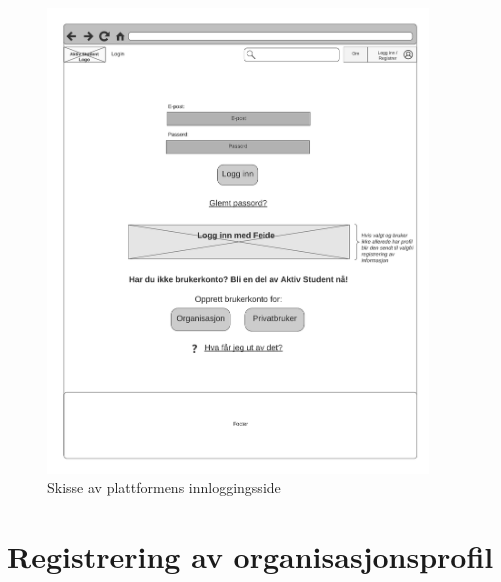 \begin{figure}[H]
\centering
\includegraphics[width=0.9\textwidth]{Illustrasjoner/Skisser/2.0/2-7-logg-inn.png}
\caption{Skisse av plattformens innloggingsside}
\label{vedlegg:2-7-innlogging}
\end{figure}

\section{Registrering av organisasjonsprofil}

